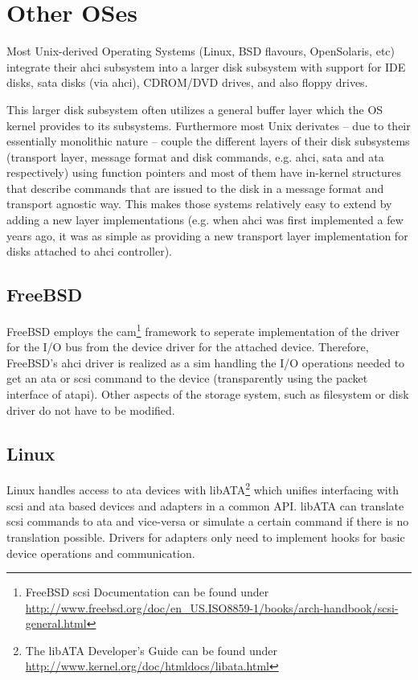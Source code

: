 \section{Other OSes}

Most Unix-derived Operating Systems (Linux, BSD flavours, OpenSolaris, etc)
integrate their \ac{ahci} subsystem into a larger disk subsystem with support
for IDE disks, \ac{sata} disks (via \ac{ahci}), CDROM/DVD drives, and also
floppy drives.

This larger disk subsystem often utilizes a general buffer layer which the OS
kernel provides to its subsystems. Furthermore most Unix derivates -- due to
their essentially monolithic nature -- couple the different layers of their
disk subsystems (transport layer, message format and disk commands, e.g.
\ac{ahci}, \ac{sata} and \ac{ata} respectively) using function pointers and
most of them have in-kernel structures that describe commands that are issued
to the disk in a message format and transport agnostic way. This makes those
systems relatively easy to extend by adding a new layer implementations (e.g.
when \ac{ahci} was first implemented a few years ago, it was as simple as
providing a new transport layer implementation for disks attached to \ac{ahci}
controller).

\subsection{FreeBSD}

FreeBSD employs the \ac{cam}\footnote{FreeBSD \acs{scsi} Documentation can be
found under
\url{http://www.freebsd.org/doc/en_US.ISO8859-1/books/arch-handbook/scsi-general.html}}
framework to seperate implementation of the driver for the I/O bus from the
device driver for the attached device. Therefore, FreeBSD's \ac{ahci} driver is
realized as a \ac{sim} handling the I/O operations needed to get an \ac{ata} or
\acs{scsi} command to the device (transparently using the packet interface of
\ac{atapi}). Other aspects of the storage system, such as filesystem or disk
driver do not have to be modified.

\subsection{Linux}

Linux handles access to \ac{ata} devices with libATA\footnote{The libATA
Developer's Guide can be found under
\url{http://www.kernel.org/doc/htmldocs/libata.html}} which unifies interfacing
with \acs{scsi} and \ac{ata} based devices and adapters in a common API. libATA
can translate \acs{scsi} commands to \ac{ata} and vice-versa or simulate a
certain command if there is no translation possible.  Drivers for adapters only
need to implement hooks for basic device operations and communication.
